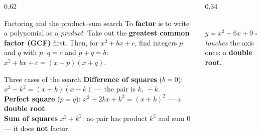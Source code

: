 \documentclass[aspectratio=169, 11pt]{beamer}
\newcommand{\lgrid}[4]{%
  \draw[step=1, linegray!45, thin] (#1,#3) grid (#2,#4);
  \draw[->, thick, charcoal] (#1,0)--(#2,0) node[below right, font=\tiny]{$x$};
  \draw[->, thick, charcoal] (0,#3)--(0,#4) node[left, font=\tiny]{$y$};}
\begin{document}
\begin{frame}[t, plain]
  \begin{columns}[T]
    \begin{column}{0.62\textwidth}
      \begin{block}{Factoring and the product--sum search}
        To \textbf{factor} is to write a polynomial as a \emph{product}. Take out the
        \textbf{greatest common factor (GCF)} first. Then, for $x^2+bx+c$, find integers $p$ and
        $q$ with $p\cdot q=c$ and $p+q=b$: \; $x^2+bx+c=(x+p)(x+q)$.
      \end{block}
      \vspace{2pt}
      \begin{block}{Three cases of the search}
        \small
        \textbf{Difference of squares} ($b=0$): $x^2-k^2=(x+k)(x-k)$ --- the pair is $k,\,-k$.\\[2pt]
        \textbf{Perfect square} ($p=q$): $x^2+2kx+k^2=(x+k)^2$ --- a \textbf{double root}.\\[2pt]
        \textbf{Sum of squares} $x^2+k^2$: no pair has product $k^2$ and sum $0$ --- it does
        \textbf{not} factor.
      \end{block}
    \end{column}
    \begin{column}{0.34\textwidth}
      \centering
      \\[-2pt]
      {\scriptsize $y=x^2-6x+9=(x-3)^2$ \emph{touches} the axis once: a \textbf{double root}.}
    \end{column}
  \end{columns}
\end{frame}
\end{document}

